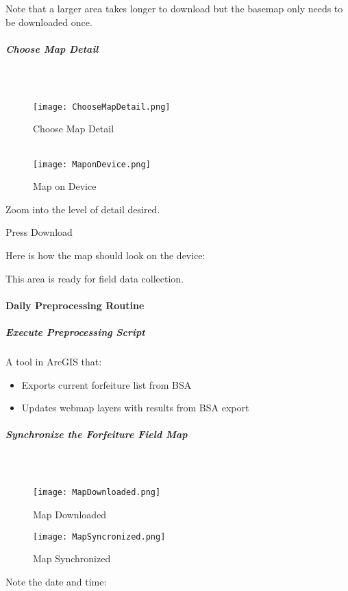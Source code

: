\documentclass[class=article , crop=false, titlepage, twoside, multi={itemize, figure, verbatim}, float=false]{standalone}
\begin{document}
\noindent \footnotesize Note that a larger area takes longer to download but the basemap only needs to be downloaded once.
\clearpage
\subparagraph{Choose Map Detail}

\subparagraph*{\\}
\begin{wrapfigure}{r}{0.5\textwidth}
\centering
\texttt{[image: ChooseMapDetail.png]}
\caption{Choose Map Detail}
\vspace{.25in}
\HRule \\[.4cm] %
\vspace{.25in}
\texttt{[image: MaponDevice.png]}
\caption{Map on Device}
\end{wrapfigure}
Zoom into the level of detail desired.
\vspace{.5in}

\noindent Press Download \\
\vspace{3in}

\noindent Here is how the map should look on the device:\\
\vspace{1in}

\noindent This area is ready for field data collection.
\clearpage


\paragraph{Daily Preprocessing Routine}

\subparagraph{Execute Preprocessing Script}A tool in ArcGIS that:

\begin{itemize}

\item Exports current forfeiture list from BSA
\item Updates webmap layers with results from BSA export


\end{itemize}

\clearpage
\subparagraph{Synchronize the Forfeiture Field Map\\}
\subparagraph*{\\}
\begin{wrapfigure}{r}{0.5\textwidth}
\centering
\texttt{[image: MapDownloaded.png]}
\caption{Map Downloaded}
\vspace{.5in}
\texttt{[image: MapSyncronized.png]}
\caption{Map Synchronized}
\end{wrapfigure}
Note the date and time:
\vspace{1.5in}
\end{document}
